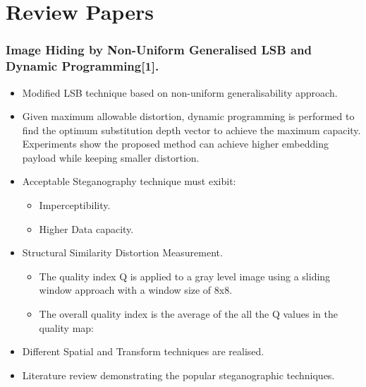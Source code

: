 \documentclass{beamer} %
\theoremstyle{definition} %
\begin{document}
\section{Review Papers}
\begin{frame}
\frametitle{Image Hiding by Non-Uniform Generalised LSB and Dynamic Programming[1].}
\begin{itemize}
	\item{Modified LSB technique based on non-uniform generalisability approach.}
	\item{Given maximum	allowable distortion, dynamic programming is performed to find the optimum substitution depth vector to achieve the maximum capacity. Experiments show the proposed method can achieve higher embedding payload while keeping smaller distortion.}
   \item{Acceptable Steganography technique must exibit:}
   \begin{itemize}
   	\item{Imperceptibility. }
   	\item{Higher Data capacity.}
   \end{itemize}
\item Structural Similarity Distortion Measurement.
   \begin{itemize}
   	\item {The quality index Q is applied to a gray level image using
   		a sliding window approach with a window size of 8x8.}
   	\item {The overall quality index is the average of the all
   		the Q values in the quality map:}
   	
   \end{itemize}
   \item{ Different Spatial and Transform techniques are realised.  }
   \item{Literature review demonstrating the popular steganographic techniques.}
\end{itemize}
\end{frame}
\end{document}
